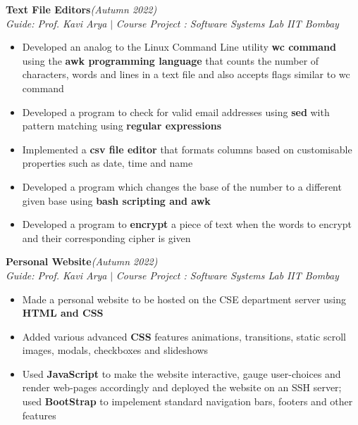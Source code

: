 \documentclass[a4paper,10pt]{article}
\begin{document}
\vspace{\baselineskip}
\vspace{-12pt}
\noindent\textbf{\large Text File Editors}\hfill{\sl \small (Autumn 2022)}\\
{\it Guide: Prof. Kavi Arya} $|$ {\it Course Project : Software Systems Lab } \hfill{\it IIT Bombay}
\\\vspace{-15pt}
\begin{itemize}[itemsep = -0.65 mm, leftmargin=*]
    \item Developed an analog to the Linux Command Line utility \textbf{wc command} using the \textbf{awk programming language}
          that counts the number of characters, words and lines in a text file and also accepts flags similar to wc command
    \item Developed a program to check for valid email addresses using \textbf{sed} with pattern matching using \textbf{regular expressions}
    \item Implemented a \textbf{csv file editor} that formats columns based on customisable properties such as date, time and name
    \item Developed a program which changes the base of the number to a different given base using \textbf{bash scripting and awk}
    \item Developed a program to \textbf{encrypt} a piece of text when the words to encrypt and their corresponding cipher is given
\end{itemize}
\vspace{\baselineskip}
\vspace{-12pt}
\noindent\textbf{\large Personal Website}\hfill{\sl \small (Autumn 2022)}\\
{\it Guide: Prof. Kavi Arya} $|$ {\it Course Project : Software Systems Lab } \hfill{\it IIT Bombay}
\\\vspace{-15pt}
\begin{itemize}[itemsep = -0.65 mm, leftmargin=*]
    \item Made a personal website to be hosted on the CSE department server using \textbf{HTML and CSS}
    \item Added various advanced \textbf{CSS} features animations, transitions, static scroll images, modals, checkboxes and slideshows
    \item Used \textbf{JavaScript} to make the website interactive, gauge user-choices and render web-pages accordingly and deployed the website on an SSH server; used \textbf{BootStrap} to impelement standard navigation bars, footers and other features
\end{itemize}
\end{document}
